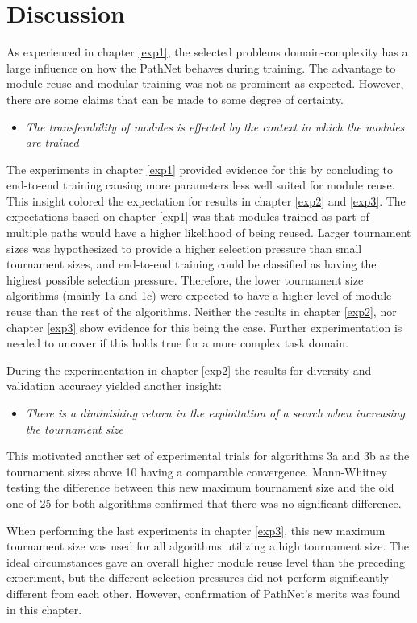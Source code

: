 \section{Discussion}
As experienced in chapter \ref{exp1}, the selected problems domain-complexity has a large influence on how the PathNet behaves during training. The advantage to module reuse and modular training was not as prominent as expected. However, there are some claims that can be made to some degree of certainty.

\begin{itemize}
    \item \emph{The transferability of modules is effected by the context in which the modules are trained}
\end{itemize}
The experiments in chapter \ref{exp1} provided evidence for this by concluding to end-to-end training causing more parameters less well suited for module reuse. This insight colored the expectation for results in chapter \ref{exp2} and \ref{exp3}. The expectations based on chapter \ref{exp1} was that modules trained as part of multiple paths would have a higher likelihood of being reused. Larger tournament sizes was hypothesized to provide a higher selection pressure than small tournament sizes, and end-to-end training could be classified as having the highest possible selection pressure. Therefore, the lower tournament size algorithms (mainly 1a and 1c) were expected to have a higher level of module reuse than the rest of the algorithms. Neither the results in chapter \ref{exp2}, nor chapter \ref{exp3} show evidence for this being the case. Further experimentation is needed to uncover if this holds true for a more complex task domain. 

During the experimentation in chapter \ref{exp2} the results for diversity and validation accuracy yielded another insight: 
\begin{itemize}
    \item \emph{There is a diminishing return in the exploitation of a search when increasing the tournament size}
\end{itemize}
This motivated another set of experimental trials for algorithms 3a and 3b as the tournament sizes above 10 having a comparable convergence. Mann-Whitney testing the difference between this new maximum tournament size and the old one of 25 for both algorithms confirmed that there was no significant difference.

When performing the last experiments in chapter \ref{exp3}, this new maximum tournament size was used for all algorithms utilizing a high tournament size. The ideal circumstances gave an overall higher module reuse level than the preceding experiment, but the different selection pressures did not perform significantly different from each other. However, confirmation of PathNet's merits was found in this chapter. 


